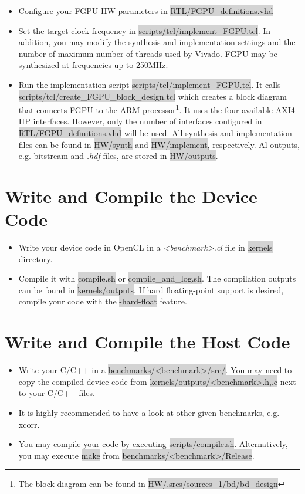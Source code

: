 \documentclass[11pt]{article}
\begin{document}
\begin{itemize}
  \item Configure your FGPU HW parameters in \colorbox{lightGray}{RTL/FGPU\_definitions.vhd}
  \item Set the target clock frequency in \colorbox{lightGray}{scripts/tcl/implement\_FGPU.tcl}. 
    In addition, you may modify the synthesis and implementation settings and the number of maximum number of threads used by Vivado.
    FGPU may be synthesized at frequencies up to 250MHz.
  \item Run the implementation script \colorbox{lightGray}{scripts/tcl/implement\_FGPU.tcl}. 
    It calls \colorbox{lightGray}{scripts/tcl/create\_FGPU\_block\_design.tcl} 
    which creates a block diagram that connects FGPU to the ARM processor\footnote{
      The block diagram can be found in \colorbox{lightGray}{HW/.srcs/sources\_1/bd/bd\_design}}.
    It uses the four available AXI4-HP interfaces. 
    However, only the number of interfaces configured in \colorbox{lightGray}{RTL/FGPU\_definitions.vhd} will be used.
    All synthesis and implementation files can be found in 
    \colorbox{lightGray}{HW/synth} and \colorbox{lightGray}{HW/implement}, respectively.
    Al outputs, e.g. bitstream and \emph{.hdf} files, are stored in \colorbox{lightGray}{HW/outputs}.
\end{itemize}

\section{Write and Compile the Device Code}
\begin{itemize}
  \item Write your device code in OpenCL in a \emph{<benchmark>.cl} file in \colorbox{lightGray}{kernels} directory.
  \item Compile it with \colorbox{lightGray}{compile.sh} or \colorbox{lightGray}{compile\_and\_log.sh}. 
    The compilation outputs can be found in \colorbox{lightGray}{kernels/outputs}.
    If hard floating-point support is desired, compile your code with the \colorbox{lightGray}{-hard-float} feature.
\end{itemize}

\section{Write and Compile the Host Code}
\begin{itemize}
  \item Write your C/C++ in a \colorbox{lightGray}{benchmarks/<benchmark>/src/}.
    You may need to copy the compiled device code from \colorbox{lightGray}{kernels/outputs/<benchmark>{.h,.c}} next to your C/C++ files.
  \item It is highly recommended to have a look at other given benchmarks, e.g. xcorr.
  \item You may compile your code by executing \colorbox{lightGray}{scripts/compile.sh}.
    Alternatively, you may execute \colorbox{lightGray}{make} from \colorbox{lightGray}{benchmarks/<benchmark>/Release}.
\end{itemize}
\end{document}
